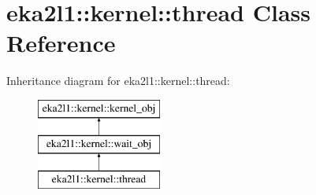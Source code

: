 \hypertarget{classeka2l1_1_1kernel_1_1thread}{}\section{eka2l1\+:\+:kernel\+:\+:thread Class Reference}
\label{classeka2l1_1_1kernel_1_1thread}
Inheritance diagram for eka2l1\+:\+:kernel\+:\+:thread\+:\begin{figure}[H]
\begin{center}
\leavevmode
\includegraphics[height=3.000000cm]{classeka2l1_1_1kernel_1_1thread}
\end{center}
\end{figure}
